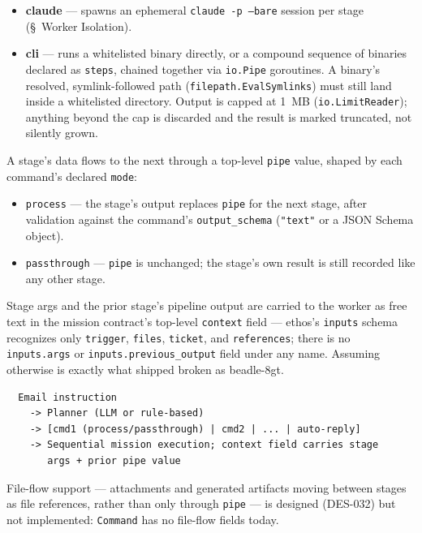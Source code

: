 \documentclass[a4paper,10pt,fleqn]{article}
\begin{document}
\begin{itemize}
  \item \textbf{claude} --- spawns an ephemeral \texttt{claude -p
    --bare} session per stage (\S~Worker Isolation).
  \item \textbf{cli} --- runs a whitelisted binary directly, or a
    compound sequence of binaries declared as \texttt{steps}, chained
    together via \texttt{io.Pipe} goroutines.  A binary's resolved,
    symlink-followed path (\texttt{filepath.\allowbreak EvalSymlinks})
    must still land inside a whitelisted directory.  Output is capped
    at 1~MB
    (\texttt{io.\allowbreak LimitReader}); anything beyond the cap is
    discarded
    and the result is marked truncated, not silently grown.
\end{itemize}

A stage's data flows to the next through a top-level \texttt{pipe}
value, shaped by each command's declared \texttt{mode}:

\begin{itemize}
  \item \texttt{process} --- the stage's output replaces \texttt{pipe}
    for the next stage, after validation against the command's
    \texttt{output\_schema} (\texttt{"text"} or a JSON Schema object).
  \item \texttt{passthrough} --- \texttt{pipe} is unchanged; the
    stage's own result is still recorded like any other stage.
\end{itemize}

Stage args and the prior stage's pipeline output are carried to the
worker as free text in the mission contract's top-level
\texttt{context} field --- ethos's \texttt{inputs} schema recognizes
only \texttt{trigger}, \texttt{files}, \texttt{ticket}, and
\texttt{references}; there is no \texttt{inputs.args} or
\texttt{inputs.previous\_output} field under any name.  Assuming
otherwise is exactly what shipped broken as beadle-8gt.

\begin{verbatim}
  Email instruction
    -> Planner (LLM or rule-based)
    -> [cmd1 (process/passthrough) | cmd2 | ... | auto-reply]
    -> Sequential mission execution; context field carries stage
       args + prior pipe value
\end{verbatim}

File-flow support --- attachments and generated artifacts moving
between stages as file references, rather than only through
\texttt{pipe} --- is designed (DES-032) but not implemented:
\texttt{Command} has no file-flow fields today.
\end{document}
